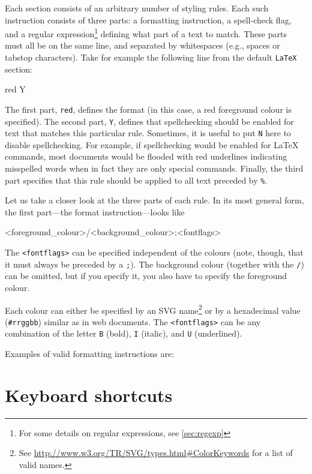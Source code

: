 Each section consists of an arbitrary number of styling rules. Each such instruction consists of three parts: a formatting instruction, a spell-check flag, and a regular expression\footnote{For some details on regular expressions, see \ref{sec:regexp}} defining what part of a text to match. These parts must all be on the same line, and separated by whitespaces (e.g., spaces or tabstop characters). Take for example the following line from the default \verb|LaTeX| section:
\begin{verbExample}
red    Y    %
\end{verbExample}
The first part, \verb|red|, defines the format (in this case, a red foreground colour is specified). The second part, \verb|Y|, defines that spellchecking should be enabled for text that matches this particular rule. Sometimes, it is useful to put \verb|N| here to disable spellchecking. For example, if spellchecking would be enabled for {\LaTeX} commands, most documents would be flooded with red underlines indicating misspelled words when in fact they are only special commands. Finally, the third part specifies that this rule should be applied to all text preceded by \verb|%|.

Let us take a closer look at the three parts of each rule. In its most general form, the first part---the format instruction---looks like 
\begin{verbExample}
<foreground_colour>/<background_colour>;<fontflags>
\end{verbExample}
The \verb|<fontflags>| can be specified independent of the colours (note, though, that it must always be preceded by a \verb|;|). The background colour (together with the \verb|/|) can be omitted, but if you specify it, you also have to specify the foreground colour.

Each colour can either be specified by an SVG name\footnote{See \url{http://www.w3.org/TR/SVG/types.html#ColorKeywords} for a list of valid names.} or by a hexadecimal value (\verb|#rrggbb|) similar as in web documents. The \verb|<fontflags>| can be any combination of the letter \verb|B| (bold), \verb|I| (italic), and \verb|U| (underlined).

Examples of valid formatting instructions are:

\section{Keyboard shortcuts}
\label{sec.shortcuts}

